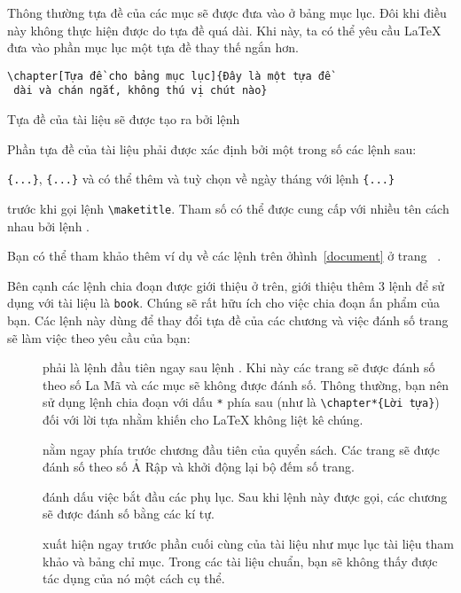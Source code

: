 Thông thường tựa đề của các mục sẽ được đưa vào ở bảng mục lục. Đôi khi điều này không thực hiện được do tựa đề quá dài. Khi này, ta có thể yêu cầu \LaTeX{} đưa vào phần mục lục một tựa đề thay thế ngắn hơn.

\begin{code}
\verb|\chapter[Tựa đề cho bảng mục lục]{Đây là một tựa đề|\\
\verb| dài và chán ngắt, không thú vị chút nào}|
\end{code}

Tựa đề của tài liệu sẽ được tạo ra bởi lệnh
\begin{lscommand}
\end{lscommand}
\noindent Phần tựa đề của tài liệu phải được xác định bởi một
trong số các lệnh sau:
\begin{lscommand}
\verb|{...}|, \verb|{...}| và có thể thêm và
tuỳ chọn về ngày tháng với lệnh \verb|{...}|
\end{lscommand}
\noindent trước khi gọi lệnh \verb|\maketitle|. Tham số  có thể được cung cấp với nhiều tên cách nhau bởi lệnh
.

Bạn có thể tham khảo thêm ví dụ về các lệnh trên ởhình~\ref{document} ở trang ~\pageref{document}.

Bên cạnh các lệnh chia đoạn được giới thiệu ở trên, \LaTeXe{} giới thiệu thêm 3 lệnh để sử dụng với tài liệu là \verb|book|. Chúng sẽ rất hữu ích cho việc chia đoạn ấn phẩm của bạn. Các lệnh này dùng để thay đổi tựa đề của các chương và việc đánh số trang sẽ làm việc theo yêu cầu của bạn:

\begin{description}
\item[] phải là lệnh đầu tiên ngay sau lệnh \verb||. Khi này các trang sẽ được đánh số theo số La Mã và các mục sẽ không được đánh số. Thông thường, bạn nên sử dụng lệnh chia đoạn với dấu \verb|*| phía sau (như là \verb|\chapter*{Lời tựa}|) đối với lời tựa nhằm khiến cho \LaTeX{} không liệt kê chúng.

\item[] nằm ngay phía trước chương đầu tiên của quyển sách. Các trang sẽ được đánh số theo số Ả Rập và khởi động lại bộ đếm số trang.

\item[] đánh dấu việc bắt đầu các phụ lục. Sau khi lệnh này được gọi, các chương sẽ được đánh số bằng các kí tự.

\item[] xuất hiện ngay trước phần cuối cùng của tài liệu như mục lục tài liệu tham khảo và bảng chỉ mục.
Trong các tài liệu chuẩn, bạn sẽ không thấy được tác dụng của nó một cách cụ thể.
\end{description}

